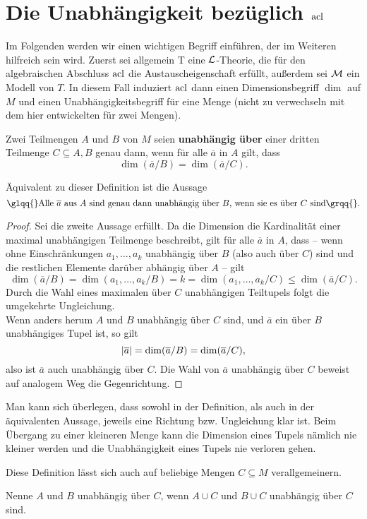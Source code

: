 \chapter{Die Unabhängigkeit bezüglich $\operatorname{acl}$}\label{Kapitel 0}
Im Folgenden werden wir einen wichtigen Begriff einführen, der im Weiteren hilfreich sein wird. Zuerst sei allgemein T eine $\mathcal{L}$-Theorie, die für den algebraischen Abschluss $\operatorname{acl}$ die Austauscheigenschaft erfüllt, außerdem sei $\mathcal{M}$ ein Modell von $T$. In diesem Fall induziert $\operatorname{acl}$ dann einen Dimensionsbegriff $\dim$ auf $M$ und einen Unabhängigkeitsbegriff für eine Menge (nicht zu verwechseln mit dem hier entwickelten für zwei Mengen).

\begin{definition}
	Zwei Teilmengen $A$ und $B$ von $M$ seien \textbf{unabhängig über} einer dritten Teilmenge $C\subseteq A,B$ genau dann, wenn für alle $\overline{a}$ in $A$ gilt, dass $$\dim(\overline{a}/B)=\dim(\overline{a}/C).$$
\end{definition}

\begin{lemma}
	Äquivalent zu dieser Definition ist die Aussage
	$$\glqq{}\text{Alle }\overline{a}\text{ aus }A\text{ sind genau dann unabhängig über }B\text{, wenn sie es über }C\text{ sind}\grqq{}.$$
\end{lemma}
\begin{proof}
	Sei die zweite Aussage erfüllt. Da die Dimension die Kardinalität einer maximal unabhängigen Teilmenge beschreibt, gilt für alle $\overline{a}$ in $A$, dass \--- wenn ohne Einschränkungen $a_1,\dots,a_k$ unabhängig über $B$ (also auch über $C$) sind und die restlichen Elemente darüber abhängig über $A$ \--- gilt $$\dim(\overline{a}/B)=\dim(a_1,\dots,a_k/B)=k=\dim(a_1,\dots,a_k/C)\leq\dim(\overline{a}/C).$$
	Durch die Wahl eines maximalen über $C$ unabhängigen Teiltupels folgt die umgekehrte Ungleichung.\\
	Wenn anders herum $A$ und $B$ unabhängig über $C$ sind, und $\overline{a}$ ein über $B$ unabhängiges Tupel ist, so gilt
	$${\left| \overline{a} \right|}=\dim(\overline{a}/B)=\dim(\overline{a}/C),$$
	also ist $\overline{a}$ auch unabhängig über $C$. Die Wahl von $\overline{a}$ unabhängig über $C$ beweist auf analogem Weg die Gegenrichtung.
\end{proof}

\begin{remark}
	Man kann sich überlegen, dass sowohl in der Definition, als auch in der äquivalenten Aussage, jeweils eine Richtung bzw. Ungleichung klar ist. Beim Übergang zu einer kleineren Menge kann die Dimension eines Tupels nämlich nie kleiner werden und die Unabhängigkeit eines Tupels nie verloren gehen.
\end{remark}
\newpage
Diese Definition lässt sich auch auf beliebige Mengen $C\subseteq M$ verallgemeinern.
\begin{definition}
	Nenne $A$ und $B$ unabhängig über $C$, wenn $A\cup C$ und $B\cup C$ unabhängig über $C$ sind.
\end{definition}

